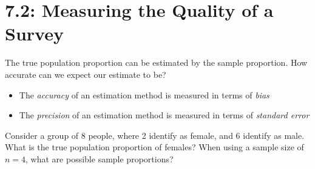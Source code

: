 \documentclass[../mathNotesPreamble]{subfiles}
\begin{document}
  \section{7.2: Measuring the Quality of a Survey}
    The true population proportion can be estimated by the sample proportion. How accurate can we expect our estimate to be?
    \begin{itemize}
      \item The \emph{accuracy} of an estimation method is measured in terms of \emph{bias}
      \item The \emph{precision} of an estimation method is measured in terms of \emph{standard error}
    \end{itemize}
    \vspace*{2\baselineskip}

    \begin{ex*}
      Consider a group of 8 people, where 2 identify as female, and 6 identify as male. What is the true population proportion of females? When using a sample size of $n=4$, what are possible sample proportions?
    \end{ex*}
    \begin{flushright}
    \end{flushright}
    \pagebreak
    
\end{document}
